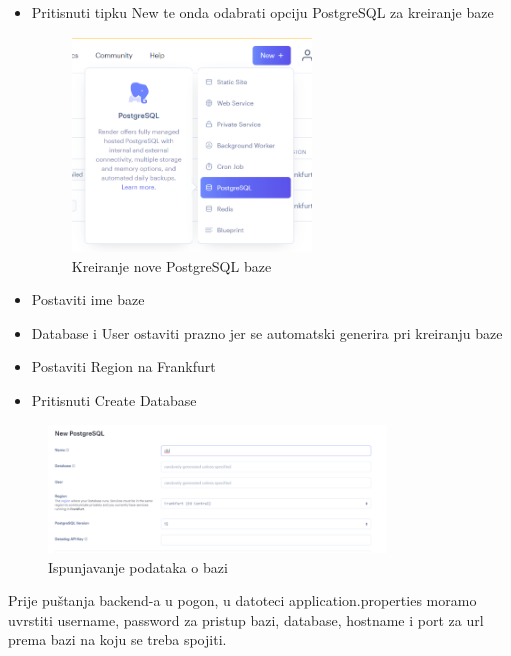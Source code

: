                 \begin{itemize}
                    \item Pritisnuti tipku New te onda odabrati opciju PostgreSQL za kreiranje baze
                    \begin{figure}[H]
    			\includegraphics[width=0.6\textwidth,height=0.3\textheight]{slike/postgresqlCreate.png}
    			\centering
    			\caption{Kreiranje nove PostgreSQL baze}
    			\label{fig:newPostgreSQLDB}
    			\end{figure}
                    \item Postaviti ime baze
                    \item Database i User ostaviti prazno jer se automatski generira pri kreiranju baze
                    \item Postaviti Region na Frankfurt
                    \item Pritisnuti Create Database
                \end{itemize}

                \begin{figure}[H]
				\includegraphics[width=0.8\textwidth,height=0.25\textheight]{slike/postgresqlNew.png}
				\centering
				\caption{Ispunjavanje podataka o bazi}
				\label{fig:postgresqlFillData}
			\end{figure}

                Prije puštanja backend-a u pogon, u datoteci application.properties moramo uvrstiti username, password za pristup bazi, database, hostname i port za url prema bazi na koju se treba spojiti.

